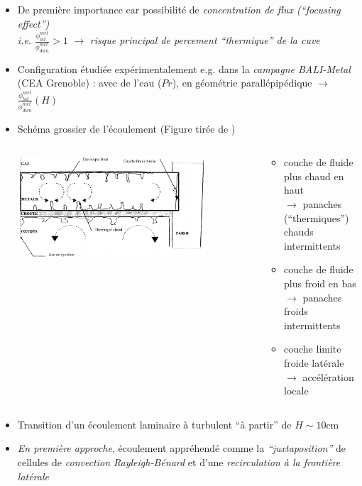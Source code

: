 \begin{frame}[fragile]
\begin{itemize}
\item De première importance car possibilité de \emph{concentration de flux (``focusing effect'')} \\ \textit{i.e.} $\frac{\phi^{met}_{lat}}{\phi^{met}_{dwn}}>1$ $\rightarrow$ \emph{risque principal de percement ``thermique'' de la cuve}
\item Configuration étudiée expérimentalement e.g. dans la \emph{campagne BALI-Metal} (CEA Grenoble) : avec de l'eau (\danger $Pr$), en géométrie parallépipédique $\rightarrow$ $\frac{\phi^{met}_{lat}}{\phi^{met}_{dwn}}\left(H\right)$
\item Schéma grossier de l'écoulement (Figure tirée de \cite{Villermaux1999})
\begin{columns}[T]
    \begin{column}{0.6\textwidth}
\centering \includegraphics[width=0.8\textwidth]{Figures/metal_layer_flow.png}
    \end{column}
    \begin{column}{0.5\textwidth}
    \hskip -1cm \begin{minipage}{\textwidth}
    \begin{itemize}
    \item couche de fluide plus chaud en haut\\ $\rightarrow$ panaches (``thermiques'') chauds intermittents
    \item couche de fluide plus froid en bas \\ $\rightarrow$ panaches froids intermittents
    \item couche limite froide latérale \\ $\rightarrow$ accélération locale
    \end{itemize}
    \end{minipage}
    \end{column}
\end{columns}
\item Transition d'un écoulement laminaire à turbulent ``à partir'' de $H \sim10$cm
\item \emph{En première approche}, écoulement appréhendé comme la \emph{``juxtaposition''} de cellules de \emph{convection Rayleigh-Bénard} et d'une \emph{recirculation à la frontière latérale}
\end{itemize}
\end{frame}
